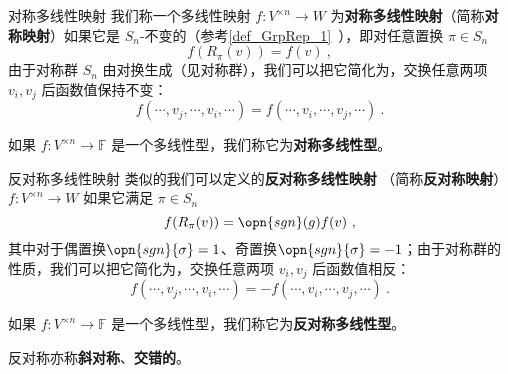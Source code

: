 \begin{definition}{对称多线性映射}
我们称一个多线性映射 $f: V^{\times n} \to W$ 为\textbf{对称多线性映射}（简称\textbf{对称映射}）如果它是 $S_n$-不变的（参考\autoref{def_GrpRep_1}~），即对任意置换 $\pi \in S_n$
\begin{equation}
f(R_\pi(v)) = f(v)~,
\end{equation}
由于对称群 $S_n$ 由对换生成（见对称群），我们可以把它简化为，交换任意两项 $v_i, v_j$ 后函数值保持不变：
\begin{equation}
f(\cdots, v_j, \cdots, v_i, \cdots) = f(\cdots, v_i, \cdots, v_j, \cdots)~.
\end{equation}

如果 $f: V^{\times n} \to \mathbb{F}$ 是一个多线性型，我们称它为\textbf{对称多线性型}。
\end{definition}


%

\begin{definition}{反对称多线性映射}\label{def_MulMap_1}
类似的我们可以定义的\textbf{反对称多线性映射} （简称\textbf{反对称映射}）$f: V^{\times n} \to W$ 如果它满足 $\pi \in S_n$
\begin{equation}
f(R_\pi(v)) = \opn{sgn}(g) f(v)~,
\end{equation}
其中对于偶置换$\opn{sgn}{\sigma} = 1$、奇置换$\opn{sgn}{\sigma} = -1$；由于对称群的性质，我们可以把它简化为，交换任意两项 $v_i, v_j$ 后函数值相反：
\begin{equation}
f(\cdots, v_j, \cdots, v_i, \cdots) = - f(\cdots, v_i, \cdots, v_j, \cdots)~.
\end{equation}

如果 $f: V^{\times n} \to \mathbb{F}$ 是一个多线性型，我们称它为\textbf{反对称多线性型}。

反对称亦称\textbf{斜对称}、\textbf{交错的}。
\end{definition}

